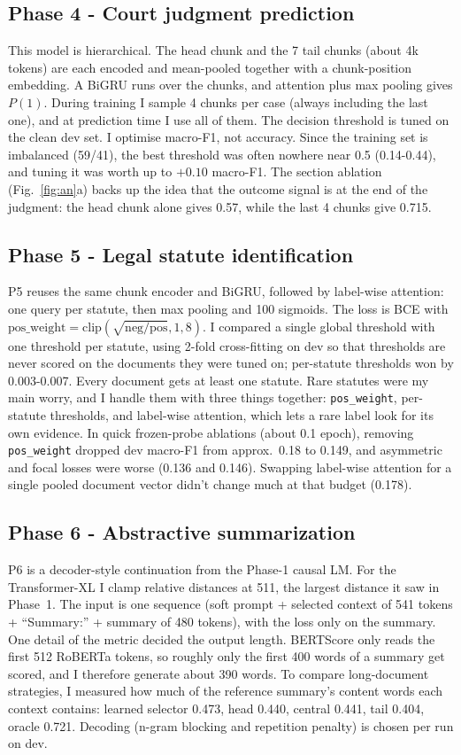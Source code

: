 \documentclass[11pt, oneside]{article}
\begin{document}
\subsection{Phase 4 - Court judgment prediction}
This model is hierarchical. The head chunk and the 7 tail chunks (about 4k
tokens) are each encoded and mean-pooled together with a chunk-position
embedding. A BiGRU runs over the chunks, and attention plus max pooling gives
$P(1)$. During training I sample 4 chunks per case (always including the last
one), and at prediction time I use all of them. The decision threshold is
tuned on the clean dev set.
I optimise macro-F1, not accuracy. Since the training set is imbalanced
(59/41), the best threshold was often nowhere near 0.5 (0.14-0.44), and
tuning it was worth up to $+0.10$ macro-F1. The section ablation (Fig.~\ref{fig:an}a)
backs up the idea that the outcome signal is at the end of the judgment: the
head chunk alone gives 0.57, while the last 4 chunks give 0.715.

\subsection{Phase 5 - Legal statute identification}
P5 reuses the same chunk encoder and BiGRU, followed by label-wise attention:
one query per statute, then max pooling and 100 sigmoids. The loss is BCE with
$\text{pos\_weight} = \text{clip}(\sqrt{\text{neg}/\text{pos}}, 1, 8)$. I
compared a single global threshold with one threshold per statute, using 2-fold
cross-fitting on dev so that thresholds are never scored on the documents they
were tuned on; per-statute thresholds won by 0.003-0.007. Every document gets
at least one statute.
Rare statutes were my main worry, and I handle them with three things
together: \texttt{pos\_weight}, per-statute thresholds, and label-wise
attention, which lets a rare label look for its own evidence. In quick
frozen-probe ablations (about 0.1 epoch), removing \texttt{pos\_weight}
dropped dev macro-F1 from approx.\ 0.18 to 0.149, and asymmetric and focal
losses were worse (0.136 and 0.146). Swapping label-wise attention for a single
pooled document vector didn't change much at that budget (0.178).

\subsection{Phase 6 - Abstractive summarization}
P6 is a decoder-style continuation from the Phase-1 causal LM. For the
Transformer-XL I clamp relative distances at 511, the largest distance it saw
in Phase~1. The input is one sequence (soft prompt + selected context of 541
tokens + ``Summary:'' + summary of 480 tokens), with the loss only on the
summary.
One detail of the metric decided the output length. BERTScore only reads the
first 512 RoBERTa tokens, so roughly only the first 400 words of a summary get
scored, and I therefore generate about 390 words. To compare long-document
strategies, I measured how much of the reference summary's content words each
context contains: learned selector 0.473, head 0.440, central 0.441, tail
0.404, oracle 0.721. Decoding (n-gram blocking and repetition penalty) is
chosen per run on dev.
\end{document}
